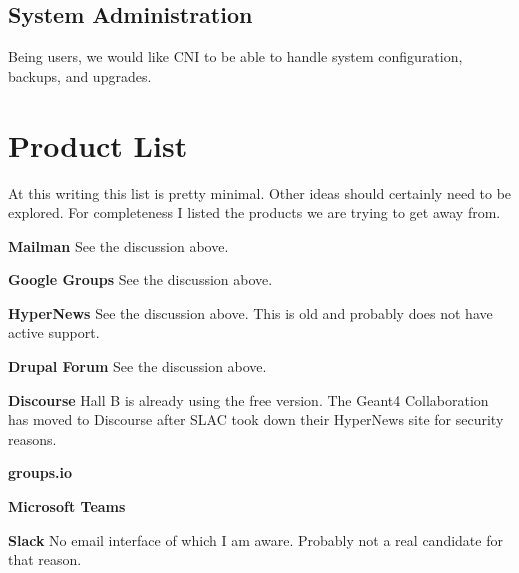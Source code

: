 \documentclass{article}
\begin{document}
\subsection{System Administration}

Being users, we would like CNI to be able to handle system
configuration, backups, and upgrades.

\section{Product List}

At this writing this list is pretty minimal. Other ideas should
certainly need to be explored. For completeness I listed the products
we are trying to get away from.

\begin{description}

\item{\bf Mailman} See the discussion above.

\item{\bf Google Groups} See the discussion above.

\item{\bf HyperNews} See the discussion above. This is old and probably does not have active support.

\item{\bf Drupal Forum} See the discussion above.

\item{\bf Discourse} Hall B is already using the free version. The
  Geant4 Collaboration has moved to Discourse after SLAC took down
  their HyperNews site for security reasons.

\item{\bf groups.io}

\item{\bf Microsoft Teams}

\item{\bf Slack} No email interface of which I am aware. Probably not a real candidate for that reason.

\end{description}
\end{document}
